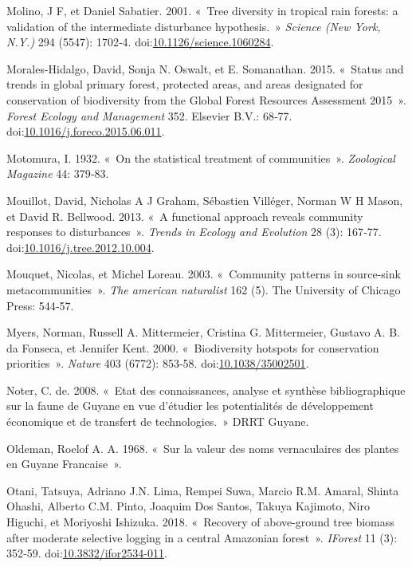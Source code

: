 \documentclass[11pt,french,A4paper,extrafontsizes,onecolumn,openright]{memoir}
\begin{document}
\hypertarget{ref-Molino2001}{}
Molino, J F, et Daniel Sabatier. 2001. «~Tree diversity in tropical rain
forests: a validation of the intermediate disturbance hypothesis.~»
\emph{Science (New York, N.Y.)} 294 (5547): 1702‑4.
doi:\href{https://doi.org/10.1126/science.1060284}{10.1126/science.1060284}.

\hypertarget{ref-Morales-Hidalgo2015}{}
Morales-Hidalgo, David, Sonja N. Oswalt, et E. Somanathan. 2015.
«~Status and trends in global primary forest, protected areas, and areas
designated for conservation of biodiversity from the Global Forest
Resources Assessment 2015~». \emph{Forest Ecology and Management} 352.
Elsevier B.V.: 68‑77.
doi:\href{https://doi.org/10.1016/j.foreco.2015.06.011}{10.1016/j.foreco.2015.06.011}.

\hypertarget{ref-Motomura1932}{}
Motomura, I. 1932. «~On the statistical treatment of communities~».
\emph{Zoological Magazine} 44: 379‑83.

\hypertarget{ref-Mouillot2013a}{}
Mouillot, David, Nicholas A J Graham, Sébastien Villéger, Norman W H
Mason, et David R. Bellwood. 2013. «~A functional approach reveals
community responses to disturbances~». \emph{Trends in Ecology and
Evolution} 28 (3): 167‑77.
doi:\href{https://doi.org/10.1016/j.tree.2012.10.004}{10.1016/j.tree.2012.10.004}.

\hypertarget{ref-Mouquet2003}{}
Mouquet, Nicolas, et Michel Loreau. 2003. «~Community patterns in
source-sink metacommunities~». \emph{The american naturalist} 162 (5).
The University of Chicago Press: 544‑57.

\hypertarget{ref-Myers2000}{}
Myers, Norman, Russell A. Mittermeier, Cristina G. Mittermeier, Gustavo
A. B. da Fonseca, et Jennifer Kent. 2000. «~Biodiversity hotspots for
conservation priorities~». \emph{Nature} 403 (6772): 853‑58.
doi:\href{https://doi.org/10.1038/35002501}{10.1038/35002501}.

\hypertarget{ref-DeNoter2008}{}
Noter, C. de. 2008. «~Etat des connaissances, analyse et synthèse
bibliographique sur la faune de Guyane en vue d'étudier les
potentialités de développement économique et de transfert de
technologies.~» DRRT Guyane.

\hypertarget{ref-Oldeman1968}{}
Oldeman, Roelof A. A. 1968. «~Sur la valeur des noms vernaculaires des
plantes en Guyane Francaise~».

\hypertarget{ref-Otani2018}{}
Otani, Tatsuya, Adriano J.N. Lima, Rempei Suwa, Marcio R.M. Amaral,
Shinta Ohashi, Alberto C.M. Pinto, Joaquim Dos Santos, Takuya Kajimoto,
Niro Higuchi, et Moriyoshi Ishizuka. 2018. «~Recovery of above-ground
tree biomass after moderate selective logging in a central Amazonian
forest~». \emph{IForest} 11 (3): 352‑59.
doi:\href{https://doi.org/10.3832/ifor2534-011}{10.3832/ifor2534-011}.
\end{document}

